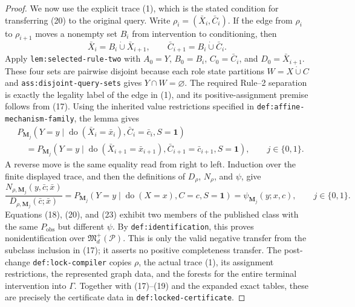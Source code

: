 \documentclass{article}
\begin{document}
\begin{proof}
We now use the explicit trace (1), which is the stated condition for transferring (20) to the original query.  Write \(\rho_i=(\bar X_i,\bar C_i)\).  If the edge from \(\rho_i\) to \(\rho_{i+1}\) moves a nonempty set \(B_i\) from intervention to conditioning, then
\[
 \bar X_i=B_i\mathbin{\dot\cup}\bar X_{i+1},
 \qquad
 \bar C_{i+1}=B_i\mathbin{\dot\cup}\bar C_i.                \tag{21}
\]
Apply \texttt{lem:selected-rule-two} with \(A_0=Y\), \(B_0=B_i\), \(C_0=\bar C_i\), and \(D_0=\bar X_{i+1}\).  These four sets are pairwise disjoint because each role state partitions \(W=X\mathbin{\dot\cup}C\) and \texttt{ass:disjoint-query-sets} gives \(Y\cap W=\varnothing\).  The required Rule--2 separation is exactly the legality label of the edge in (1), and its positive-assignment premise follows from (17).  Using the inherited value restrictions specified in \texttt{def:affine-mechanism-family}, the lemma gives
\[
 \begin{aligned}
 &P_{\mathbf M_j}\!\left(Y=y\mid
       \operatorname{do}(\bar X_i=\bar x_i),
       \bar C_i=\bar c_i,S=\mathbf1\right)\\
 &\quad=P_{\mathbf M_j}\!\left(Y=y\mid
       \operatorname{do}(\bar X_{i+1}=\bar x_{i+1}),
       \bar C_{i+1}=\bar c_{i+1},S=\mathbf1\right),
 \qquad j\in\{0,1\}.                                         \tag{22}
 \end{aligned}
\]
A reverse move is the same equality read from right to left.  Induction over the finite displayed trace, and then the definitions of \(D_\rho\), \(N_\rho\), and \(\psi\), give
\[
 \frac{N_{\rho,\mathbf M_j}(y,\bar c;\bar x)}
      {D_{\rho,\mathbf M_j}(\bar c;\bar x)}
 =P_{\mathbf M_j}(Y=y\mid\operatorname{do}(X=x),C=c,S=\mathbf1)
 =\psi_{\mathbf M_j}(y;x,c),
 \qquad j\in\{0,1\}.                                         \tag{23}
\]
Equations (18), (20), and (23) exhibit two members of the published class with the same \(P_{\mathrm{obs}}\) but different \(\psi\).  By \texttt{def:identification}, this proves nonidentification over \(\mathfrak M_d^+(\mathcal P)\).  This is only the valid negative transfer from the subclass inclusion in (17); it asserts no positive completeness transfer.  The post-change \texttt{def:lock-compiler} copies \(\rho\), the actual trace (1), its assignment restrictions, the represented graph data, and the forests for the entire terminal intervention into \(\Gamma\).  Together with (17)--(19) and the expanded exact tables, these are precisely the certificate data in \texttt{def:locked-certificate}.


\end{proof}
\end{document}
